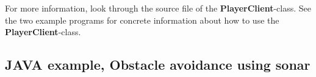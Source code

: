 \documentclass[11pt]{article}
\begin{document}
For more information, look through the source file of the {\bf PlayerClient}-class. See the two example programs for concrete information about how to use the {\bf PlayerClient}-class. 

\newpage
\subsection{JAVA example, Obstacle avoidance using sonar}

\newpage


\end{document}
